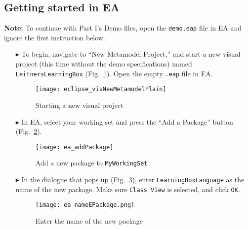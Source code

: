\newpage
\hypertarget{static:starting vis}{}
\subsection{Getting started in EA}
\visHeader
  
{\bf Note:} To continue with Part I's Demo files, open the \texttt{demo.eap} file in EA and ignore the first instruction below.

\begin{itemize}

\item[$\blacktriangleright$]  To begin, navigate to ``New Metamodel Project,'' and start a new visual project (this time without the demo specifications)
named \texttt{Leit\-ners\-Learn\-ing\-Box} (Fig.~\ref{eclipse:newVisModel}). Open the empty \texttt{.eap} file in EA.

\vspace{0.5cm}

\begin{figure}[htbp]
	\centering
  \texttt{[image: eclipse\_visNewMetamodelPlain]}
	\caption{Starting a new visual project}
	\label{eclipse:newVisModel}
\end{figure}

\vspace{0.5cm}

\item[$\blacktriangleright$] In EA, select your working set and press the ``Add a Package'' button (Fig.~\ref{ea:newPackage}). 

\begin{figure}[htbp]
	\centering
  \texttt{[image: ea\_addPackage]}
	\caption{Add a new package to \texttt{MyWorkingSet}}
	\label{ea:newPackage}
	\vspace{0.5cm}
\end{figure}

\clearpage

\item[$\blacktriangleright$] In the dialogue that pops up (Fig.~\ref{ea:newPackageName}), enter \texttt{LearningBoxLanguage} as the name of the new
package. Make sure \texttt{Class View} is selected, and click \texttt{OK}.

\vspace{0.5cm}

\begin{figure}[htbp]
	\centering
    \texttt{[image: ea\_nameEPackage.png]}
	\caption{Enter the name of the new package}
	\label{ea:newPackageName}
\end{figure}
\FloatBarrier


\end{itemize}
